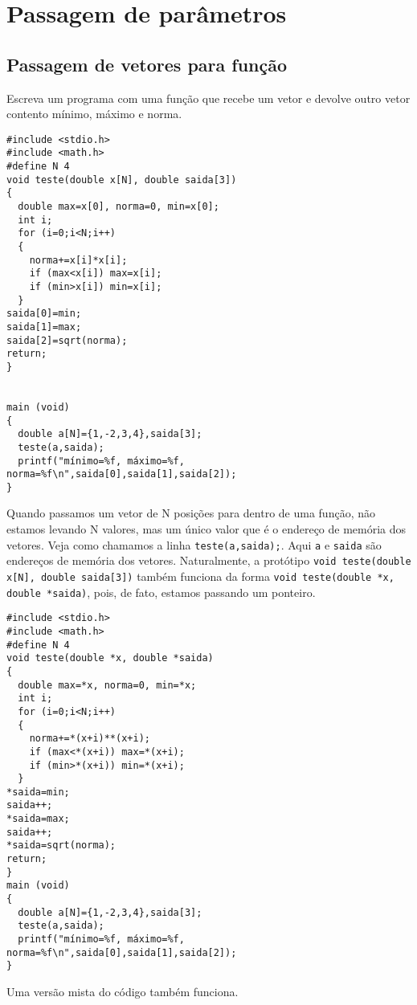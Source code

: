 
\chapter{Passagem de parâmetros}

\section{Passagem de vetores para função}
\begin{ex}
Escreva um programa com uma função que recebe um vetor e devolve outro vetor contento mínimo, máximo e norma.
\end{ex}
\begin{verbatim}
#include <stdio.h>
#include <math.h>
#define N 4
void teste(double x[N], double saida[3])
{
  double max=x[0], norma=0, min=x[0];
  int i;
  for (i=0;i<N;i++) 
  {
    norma+=x[i]*x[i];
    if (max<x[i]) max=x[i];
    if (min>x[i]) min=x[i];
  }
saida[0]=min;
saida[1]=max;
saida[2]=sqrt(norma);
return;
}


main (void)
{
  double a[N]={1,-2,3,4},saida[3];
  teste(a,saida);
  printf("mínimo=%f, máximo=%f, norma=%f\n",saida[0],saida[1],saida[2]);  
}
\end{verbatim}
Quando passamos um vetor de N posições para dentro de uma função, não estamos levando N valores, mas um único valor que é o endereço de memória dos vetores. Veja como chamamos a linha \verb|teste(a,saida);|. Aqui \verb|a| e \verb|saida| são endereços de memória dos vetores. Naturalmente, a protótipo \verb|void teste(double x[N], double saida[3])| também funciona da forma \verb|void teste(double *x, double *saida)|, pois, de fato, estamos passando um ponteiro.
\begin{verbatim}
#include <stdio.h>
#include <math.h>
#define N 4
void teste(double *x, double *saida)
{
  double max=*x, norma=0, min=*x;
  int i;
  for (i=0;i<N;i++) 
  {
    norma+=*(x+i)**(x+i);
    if (max<*(x+i)) max=*(x+i);
    if (min>*(x+i)) min=*(x+i);
  }
*saida=min;
saida++;
*saida=max;
saida++;
*saida=sqrt(norma);
return;
}
main (void)
{
  double a[N]={1,-2,3,4},saida[3];
  teste(a,saida);
  printf("mínimo=%f, máximo=%f, norma=%f\n",saida[0],saida[1],saida[2]);  
}
\end{verbatim}
Uma versão mista do código também funciona.

